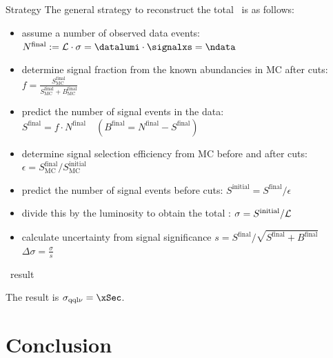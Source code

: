 \documentclass{beamer}
\newcommand{\texpath}{../analysis/tex/tex_ex}
\begin{document}
\begin{frame}{Strategy}
The general strategy to reconstruct the total \xsec\ is as follows:
\begin{itemize}
\item assume a number of observed data events: \newline
  $N^\mathrm{final} := \lumi \cdot \sigma = \datalumi \cdot \signalxs = \ndata$
\item determine signal fraction from the known abundancies in MC after cuts: \newline
  $f = \frac{S^\mathrm{final}_\mathrm{MC}}{S^\mathrm{final}_\mathrm{MC} + B^\mathrm{final}_\mathrm{MC}}$
\item predict the number of signal events in the data: \newline
  $S^\mathrm{final} = f \cdot N^\mathrm{final} \quad (B^\mathrm{final} = N^\mathrm{final} - S^\mathrm{final})$
\item determine signal selection efficiency from MC before and after cuts: \newline
  $\epsilon = S^\mathrm{final}_\mathrm{MC} / S^\mathrm{initial}_\mathrm{MC}$
\item predict the number of signal events before cuts: \newline
  $S^\mathrm{initial} = S^\mathrm{final} / \epsilon$
\item divide this by the luminosity to obtain the total \xsec: \newline
  $\sigma = S^\mathrm{initial} / \mathcal L$
\item calculate uncertainty from signal significance $s = S^\mathrm{final} / \sqrt{S^\mathrm{final} + B^\mathrm{final}}$  \newline $\Delta\sigma = \frac{\sigma}{s}$
\end{itemize}

\end{frame}

\begin{frame}{\Xsec\ result}

\vspace{-2em}

\vspace{-1em}
The result is $\sigma_\mathrm{\qqln} = \xSec$.
\end{frame}






\section{Conclusion}
\end{document}
